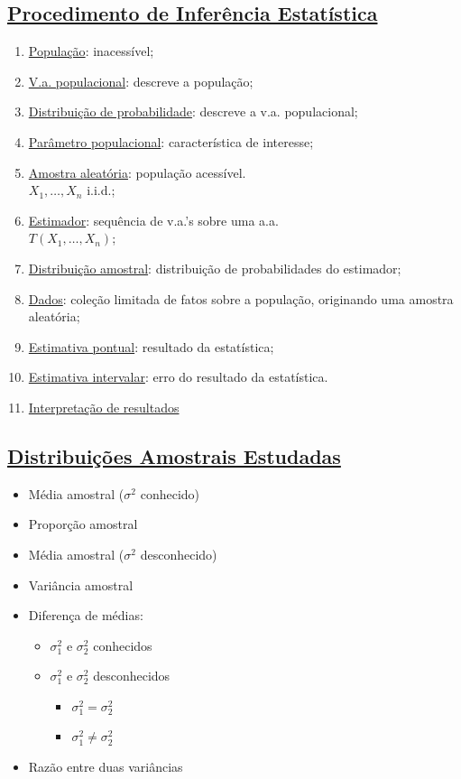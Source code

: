 \documentclass[11pt,a4paper]{article}
\begin{document}
\subsection*{\underline{Procedimento de Inferência Estatística}}
\begin{enumerate}[label=\arabic*.]
  \item \underline{População}: inacessível;
  \item \underline{V.a. populacional}: descreve a população;
  \item \underline{Distribuição de probabilidade}: descreve a v.a. populacional;
  \item \underline{Parâmetro populacional}: característica de interesse;
  \item \underline{Amostra aleatória}: população acessível. \\ $X_1,\ldots,X_n$ i.i.d.;
  \item \underline{Estimador}: sequência de v.a.'s sobre uma a.a. \\ $T(X_1,\ldots,X_n)$;
  \item \underline{Distribuição amostral}: distribuição de probabilidades do estimador;
  \item \underline{Dados}: coleção limitada de fatos sobre a população, originando uma amostra aleatória;
  \item \underline{Estimativa pontual}: resultado da estatística;
  \item \underline{Estimativa intervalar}: erro do resultado da estatística.
  \item \underline{Interpretação de resultados}
\end{enumerate}

\subsection*{\underline{Distribuições Amostrais Estudadas}}
\begin{itemize}[label=$\cdot$]
  \item Média amostral ($\sigma^2$ conhecido)
  \item Proporção amostral
  \item Média amostral ($\sigma^2$ desconhecido)
  \item Variância amostral
  \item Diferença de médias:
  \begin{itemize}[label=--]
    \item $\sigma_1^2$ e $\sigma_2^2$ conhecidos
    \item $\sigma_1^2$ e $\sigma_2^2$ desconhecidos
    \begin{itemize}[label=$\cdot$]
      \item $\sigma_1^2=\sigma_2^2$
      \item $\sigma_1^2\neq\sigma_2^2$
    \end{itemize}
  \end{itemize}
  \item Razão entre duas variâncias
\end{itemize}
\end{document}
